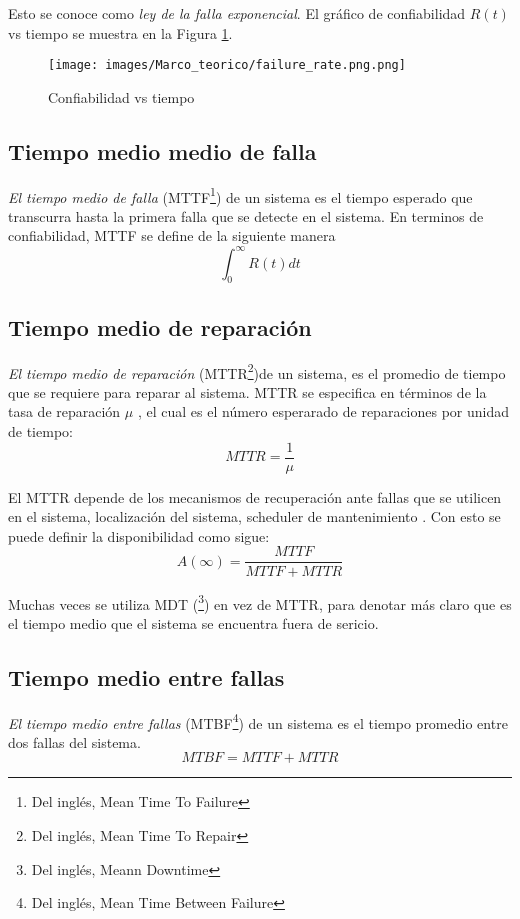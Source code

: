 Esto se conoce como \textit{ley de la falla exponencial}\citep{FTDesign}. El gráfico de confiabilidad $R(t)$ vs tiempo se muestra en la Figura \ref{fig:failure_rate}.

\begin{figure}[h]
 \centering
 \texttt{[image: images/Marco\_teorico/failure\_rate.png.png]}
  \caption{Confiabilidad vs tiempo }
\label{fig:failure_rate}
\end{figure}

\subsection{Tiempo medio medio de falla}
\textit{El tiempo medio de falla} (MTTF\footnote{Del inglés, Mean Time To Failure}) de un sistema es el tiempo esperado que transcurra hasta la primera falla que se
detecte en el sistema. En terminos de confiabilidad, MTTF se define de la siguiente manera \citep{FTDesign} \citep{Rausand04} $$\int_0^{\infty} R(t) dt$$

\subsection{Tiempo medio de reparación}
\textit{El tiempo medio de reparación} (MTTR\footnote{Del inglés, Mean Time To Repair})de un sistema, es el promedio de tiempo que se requiere para reparar al sistema.
MTTR se especifica en términos de la tasa de reparación $\mu$ \citep{FTDesign} \citep{Rausand04}, el cual es el número esperarado de reparaciones por unidad de tiempo: $$MTTR = \frac{1}{\mu}$$

El MTTR depende de los mecanismos de recuperación ante fallas que se utilicen en el sistema, localización del sistema, scheduler de mantenimiento \citep{FTDesign}. Con esto se puede definir la disponibilidad como sigue: $$A(\infty) = \frac{MTTF}{MTTF+MTTR}$$

Muchas veces se utiliza MDT (\footnote{Del inglés, Meann Downtime}) en vez de MTTR, para denotar más claro que es el tiempo medio que el sistema se encuentra fuera de sericio.

\subsection{Tiempo medio entre fallas}
\textit{El tiempo medio entre fallas} (MTBF\footnote{Del inglés, Mean Time Between Failure}) de un sistema es el tiempo promedio entre dos fallas del sistema. $$MTBF = MTTF + MTTR$$


